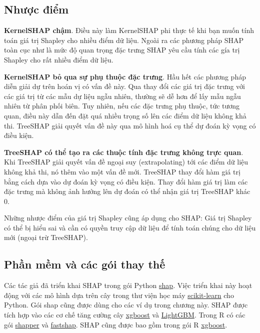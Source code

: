 \begin{enumerate}
\subsection{Nhược điểm}
\textbf{KernelSHAP chậm}. Điều này làm KernelSHAP phi thực tế khi bạn muốn tính toán giá trị Shapley cho nhiều điểm dữ liệu. Ngoài ra các phương pháp SHAP toàn cục như là mức độ quan trọng đặc trưng SHAP yêu cầu tính các gía trị Shapley cho rất nhiều điểm dữ liệu.

\textbf{KernelSHAP bỏ qua sự phụ thuộc đặc trưng}. Hầu hết các phương pháp diễn giải dự trên hoán vị có vấn đề này. Qua thay đổi các giá trị đặc trưng với các giá trị từ các mẫu dự liệu ngẫu nhiên, thường sẽ dễ hơn để lấy mẫu ngẫu nhiên từ phân phối biên. Tuy nhiên, nếu các đặc trưng phụ thuộc, tức tương quan, điều này dẫn đến đặt quá nhiều trọng số lên các điểm dữ liệu không khả thi. TreeSHAP giải quyết vấn đề này qua mô hình hoá cụ thể dự đoán kỳ vọng có điều kiện.

\textbf{TreeSHAP có thể tạo ra các thuộc tính đặc trưng không trực quan}. Khi TreeSHAP giải quyết vấn đề ngoại suy (extrapolating) tới các điểm dữ liệu không khả thi, nó thêm vào một vấn đề mới. TreeSHAP thay đổi hàm giá trị bằng cách dựa vào dự đoán kỳ vọng có điều kiện. Thay đổi hàm giá trị làm các đặc trưng mà không ảnh hưởng lên dự đoán có thể nhận giá trị TreeSHAP khác 0.

Những nhược điểm của giá trị Shapley cũng áp dụng cho SHAP: Giá trị Shapley có thể bị hiểu sai và cần có quyền truy cập dữ liệu để tính toán chúng cho dữ liệu mới (ngoại trừ TreeSHAP).

\subsection{Phần mềm và các gói thay thế}

Các tác giả đã triển khai SHAP trong gói Python \href{https://github.com/slundberg/shap }{shap}. Việc triển khai này hoạt động với các mô hình dựa trên cây trong thư viện học máy \href{ https://scikit-learn.org/stable/ }{scikit-learn} cho Python. Gói shap cũng được dùng cho các ví dụ trong chương này. SHAP được tích hợp vào các cơ chế tăng cường cây \href{ https://github.com/dmlc/xgboost/tree/master/python-package }{xgboost} và \href{ https://github.com/microsoft/LightGBM }{LightGBM}. Trong R có các gói \href{ https://modeloriented.github.io/shapper/}{shapper} và \href{https://github.com/bgreenwell/fastshap}{fastshap}. SHAP cũng được bao gồm trong gói R \href{ https://rdrr.io/cran/xgboost/man/xgb.plot.shap.html }{xgboost}.

\end{enumerate}

\clearpage